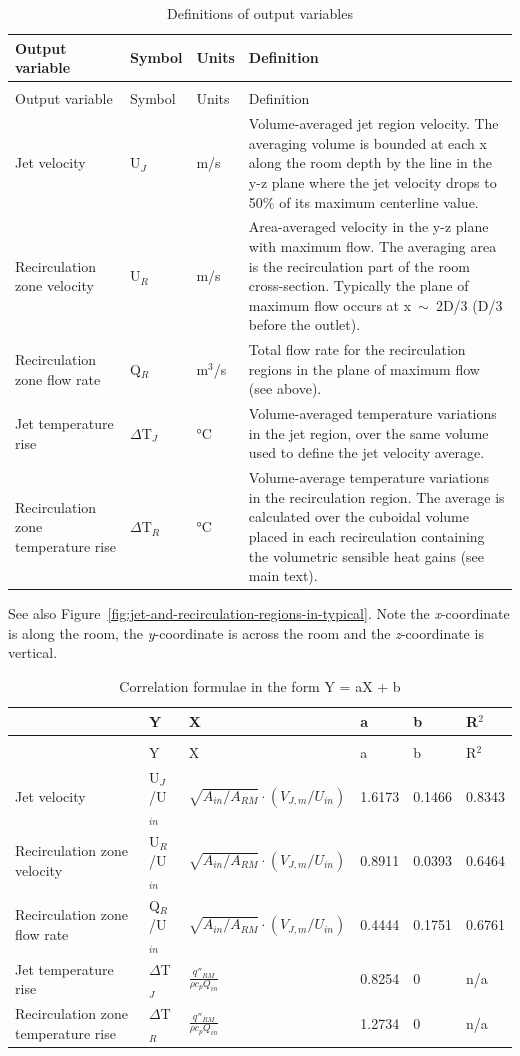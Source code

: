 {%
\begin{longtable}[c]{p{1.25in}p{0.5in}p{0.5in}p{3.0in}}
\caption{Definitions of output variables \label{table:definitions-of-output-variables}} \tabularnewline
\toprule 
Output variable & Symbol & Units & Definition \tabularnewline
\midrule
\endfirsthead

\caption[]{Definitions of output variables} \tabularnewline
\toprule 
Output variable & Symbol & Units & Definition \tabularnewline
\midrule
\endhead
Jet velocity & U\(_J\) & m/s & Volume-averaged jet region velocity. The averaging volume is bounded at each x along the room depth by the line in the y-z plane where the jet velocity drops to 50\% of its maximum centerline value. \tabularnewline
Recirculation zone velocity & U\(_R\) & m/s & Area-averaged velocity in the y-z plane with maximum flow. The averaging area is the recirculation part of the room cross-section. Typically the plane of maximum flow occurs at x~\(\sim\)~2D/3 (D/3 before the outlet). \tabularnewline
Recirculation zone flow rate & Q\(_R\) & m\(^3\)/s & Total flow rate for the recirculation regions in the plane of maximum flow (see above). \tabularnewline
Jet temperature rise & $\Delta$T\(_J\) & °C & Volume-averaged temperature variations in the jet region, over the same volume used to define the jet velocity average. \tabularnewline
Recirculation zone temperature rise & $\Delta$T\(_R\) & °C & Volume-average temperature variations in the recirculation region. The average is calculated over the cuboidal volume placed in each recirculation containing the volumetric sensible heat gains (see main text). \tabularnewline
\bottomrule
\end{longtable}

See also Figure~\ref{fig:jet-and-recirculation-regions-in-typical}. Note the \emph{x}-coordinate is along the room, the \emph{y}-coordinate is across the room and the \emph{z}-coordinate is vertical.

\begin{longtable}[c]{p{1.0in}p{0.5in}p{2.0in}p{0.5in}p{0.5in}p{0.5in}}
\caption{Correlation formulae in the form Y = aX + b \label{table:correlation-formulae-in-the-form-y-ax-+-b}} \tabularnewline
\toprule 
~ & Y & X & a & b & R\(^2\) \tabularnewline
\midrule
\endfirsthead

\caption[]{Correlation formulae in the form Y = aX + b} \tabularnewline
\toprule 
~ & Y & X & a & b & R\(^2\) \tabularnewline
\midrule
\endhead
Jet velocity & U\(_J\)/U\(_{in}\) & $\sqrt{A_{in}/A_{RM}} \cdot \left(V_{J,m}/U_{in}\right)$ & 1.6173 & 0.1466 & 0.8343 \tabularnewline
Recirculation zone velocity & U\(_R\)/U\(_{in}\) & $\sqrt{A_{in}/A_{RM}} \cdot \left(V_{J,m}/U_{in}\right)$ & 0.8911 & 0.0393 & 0.6464 \tabularnewline
Recirculation zone flow rate & Q\(_R\)/U\(_{in}\) & $\sqrt{A_{in}/A_{RM}} \cdot \left(V_{J,m}/U_{in}\right)$ & 0.4444 & 0.1751 & 0.6761 \tabularnewline
Jet temperature rise & $\Delta$T\(_J\) & $\frac{q''_{RM}}{\rho {c_p}{Q_{in}}}$ & 0.8254 & 0 & n/a \tabularnewline
Recirculation zone temperature rise & $\Delta$T\(_R\) & $\frac{q''_{RM}}{\rho {c_p}{Q_{in}}}$ & 1.2734 & 0 & n/a \tabularnewline
\bottomrule
\end{longtable}

}
